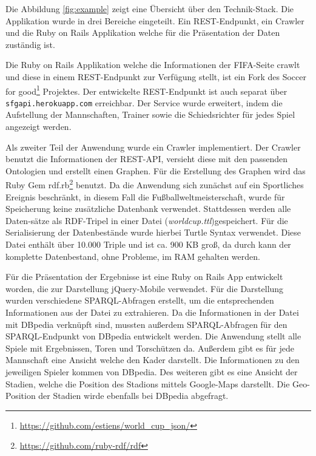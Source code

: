 \documentclass[runningheads,a4paper]{llncs}
\begin{document}
Die Abbildung \ref{fig:example} zeigt eine Übersicht über den Technik-Stack. Die Applikation wurde in drei Bereiche eingeteilt. Ein REST-Endpunkt, ein Crawler und die Ruby on Rails Applikation welche für die Präsentation der Daten zuständig ist.

Die Ruby on Rails Applikation welche die Informationen der FIFA-Seite crawlt und diese in einem REST-Endpunkt zur Verfügung stellt, ist ein Fork des Soccer for good\footnote{\url{https://github.com/estiens/world_cup_json/}} Projektes. Der entwickelte REST-Endpunkt ist auch separat über \texttt{sfgapi.herokuapp.com} erreichbar. Der Service wurde erweitert, indem die Aufstellung der Mannschaften, Trainer sowie die Schiedsrichter für jedes Spiel angezeigt werden. 

Als zweiter Teil der Anwendung wurde ein Crawler implementiert. Der Crawler benutzt die Informationen der REST-API, versieht diese mit den passenden Ontologien und erstellt einen Graphen. Für die Erstellung des Graphen wird das Ruby Gem rdf.rb\footnote{\url{https://github.com/ruby-rdf/rdf}} benutzt. Da die Anwendung sich zunächst auf ein Sportliches Ereignis beschränkt, in diesem Fall die Fußballweltmeisterschaft, wurde für Speicherung keine zusätzliche Datenbank verwendet. Stattdessen werden alle Daten-sätze als RDF-Tripel in einer Datei (\textit{worldcup.ttl})gespeichert. Für die Serialisierung der Datenbestände wurde hierbei Turtle Syntax verwendet. Diese Datei enthält über 10.000 Triple und ist ca. 900 KB groß, da durch kann der komplette Datenbestand, ohne Probleme, im RAM gehalten werden.

Für die Präsentation der Ergebnisse ist eine Ruby on Rails App entwickelt worden, die zur Darstellung jQuery-Mobile verwendet. Für die Darstellung wurden verschiedene SPARQL-Abfragen erstellt, um die entsprechenden Informationen aus der Datei zu extrahieren. Da die Informationen in der Datei mit DBpedia verknüpft sind, mussten außerdem SPARQL-Abfragen für den SPARQL-Endpunkt von DBpedia entwickelt werden. Die Anwendung stellt alle Spiele mit Ergebnissen, Toren und Torschützen da. Außerdem gibt es für jede Mannschaft eine Ansicht welche den Kader darstellt. Die Informationen zu den jeweiligen Spieler kommen von DBpedia. Des weiteren gibt es eine Ansicht der Stadien, welche die Position des Stadions mittels Google-Maps darstellt. Die Geo-Position der Stadien wirde ebenfalls bei DBpedia abgefragt.
\end{document}
